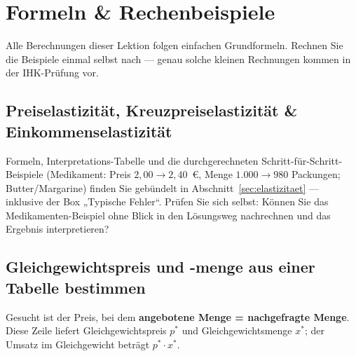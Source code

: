 \documentclass[11pt, a4paper]{article}
\begin{document}
\section{Formeln \& Rechenbeispiele}

Alle Berechnungen dieser Lektion folgen einfachen Grundformeln. Rechnen Sie die
Beispiele einmal selbst nach --- genau solche kleinen Rechnungen kommen in der
IHK-Prüfung vor.

\subsection{Preiselastizität, Kreuzpreiselastizität \& Einkommenselastizität}

Formeln, Interpretations-Tabelle und die durchgerechneten Schritt-für-Schritt-Beispiele
(Medikament: Preis $2{,}00 \rightarrow 2{,}40$~€, Menge $1.000 \rightarrow 980$
Packungen; Butter/Margarine) finden Sie gebündelt in
Abschnitt~\ref{sec:elastizitaet} --- inklusive der Box „Typische Fehler``.
Prüfen Sie sich selbst: Können Sie das Medikamenten-Beispiel ohne Blick in den
Lösungsweg nachrechnen und das Ergebnis interpretieren?

\subsection{Gleichgewichtspreis und -menge aus einer Tabelle bestimmen}

\begin{merksatz}[title={\bfseries Vorgehen}]
Gesucht ist der Preis, bei dem \textbf{angebotene Menge = nachgefragte Menge}. Diese
Zeile liefert Gleichgewichtspreis $p^*$ und Gleichgewichtsmenge $x^*$; der Umsatz im
Gleichgewicht beträgt $p^* \cdot x^*$.
\end{merksatz}
\end{document}
